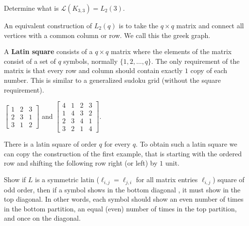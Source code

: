 \begin{problem}
	Determine what is \(\mathscr{L}\left( K_{3, 3} \right) = L_2 \left( 3 \right)  \).
\end{problem}
\begin{remark}
	An equivalent construction of \(L_2\left( q \right) \) is to take the \(q \times q\) matrix and connect all vertices with a common column or row. We call this the greek graph.
\end{remark}
\begin{definition}
	A \textbf{Latin square} consists of a \(q \times q\) matrix where the elements of the matrix consist of a set of \(q\) symbols, normally \(\{1, 2, \ldots, q\} \). The only requirement of the matrix is that every row and column should contain exactly \(1\) copy of each number. This is similar to a generalized sudoku grid (without the square requirement).
\end{definition}
\begin{example}
	\( \begin{bmatrix} 1 & 2 & 3\\ 2 & 3 & 1\\3 & 1 & 2 \end{bmatrix} \) and
	\(\begin{bmatrix} 4&1&2&3\\1&4&3&2\\2&3&4&1\\3&2&1&4 \end{bmatrix} \).\\
\end{example}
\begin{remark}
	There is a latin square of order \(q\) for every \(q\). To obtain such a latin square we can copy the construction of the first example, that is starting with the ordered row and shifting the following row right (or left) by \(1\) unit.
\end{remark}
\begin{problem}
	Show if \(L\) is a symmetric latin (\(\ell_{i, j} = \ell_{j, i}\) for all matrix entries \(\ell_{i, j}\)) square of odd order, then if a symbol shows in the bottom diagonal , it must show in the top diagonal. In other words, each symbol should show an even number of times in the bottom partition, an equal (even) number of times in the top partition, and once on the diagonal.
\end{problem}
